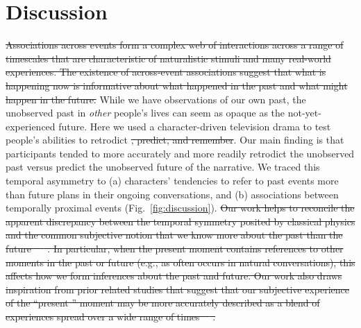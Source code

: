 \documentclass[10pt]{article}
\providecommand{\DIFaddtex}[1]{{\protect\color{blue}\uwave{#1}}} %
\providecommand{\DIFdeltex}[1]{{\protect\color{red}\sout{#1}}}                      %
\providecommand{\DIFaddbegin}{} %
\providecommand{\DIFaddend}{} %
\providecommand{\DIFdelbegin}{} %
\providecommand{\DIFdelend}{} %
\providecommand{\DIFadd}[1]{\texorpdfstring{\DIFaddtex{#1}}{#1}} %
\providecommand{\DIFdel}[1]{\texorpdfstring{\DIFdeltex{#1}}{}} %
\newcommand{\DIFscaledelfig}{0.5}
\newlength{\DIFdelgraphicswidth} %
\newlength{\DIFdelgraphicsheight} %
\newcommand{\DIFaddincludegraphics}[2][]{{\color{blue}\fbox{\DIFOincludegraphics[#1]{#2}}}} %
\newcommand{\DIFdelincludegraphics}[2][]{%
\sbox{\DIFdelgraphicsbox}{\DIFOincludegraphics[#1]{#2}}%
\settoboxwidth{\DIFdelgraphicswidth}{\DIFdelgraphicsbox} %
\settoboxtotalheight{\DIFdelgraphicsheight}{\DIFdelgraphicsbox} %
\scalebox{\DIFscaledelfig}{%
\parbox[b]{\DIFdelgraphicswidth}{\usebox{\DIFdelgraphicsbox}\\[-\baselineskip] \rule{\DIFdelgraphicswidth}{0em}}\llap{\resizebox{\DIFdelgraphicswidth}{\DIFdelgraphicsheight}{%
\setlength{\unitlength}{\DIFdelgraphicswidth}%
\begin{picture}(1,1)%
\thicklines\linethickness{2pt} %
{\color[rgb]{1,0,0}\put(0,0){\framebox(1,1){}}}%
{\color[rgb]{1,0,0}\put(0,0){\line( 1,1){1}}}%
{\color[rgb]{1,0,0}\put(0,1){\line(1,-1){1}}}%
\end{picture}%
}\hspace*{3pt}}} %
} %
\DeclareRobustCommand{\DIFaddbegin}{\DIFOaddbegin \let\includegraphics\DIFaddincludegraphics} %
\DeclareRobustCommand{\DIFaddend}{\DIFOaddend \let\includegraphics\DIFOincludegraphics} %
\DeclareRobustCommand{\DIFdelbegin}{\DIFOdelbegin \let\includegraphics\DIFdelincludegraphics} %
\DeclareRobustCommand{\DIFdelend}{\DIFOaddend \let\includegraphics\DIFOincludegraphics} %
\begin{document}
\section*{Discussion}
\DIFdelbegin \DIFdel{Associations across events form a complex web of interactions across a range of timescales that are characteristic of naturalistic stimuli and many real-world experiences.  The existence of across-event associations suggest that what is happening now is informative about what happened in the past and what might happen in the future.
}\DIFdelend While we have observations of our own past, the unobserved past in \textit{other} people's lives can seem as opaque as the not-yet-experienced future.  Here we used a character-driven television drama to test people's abilities to retrodict \DIFdelbegin \DIFdel{, predict, and remember}\DIFdelend \DIFaddbegin \DIFadd{the past and predict the future}\DIFaddend .  Our main finding is that participants tended to more accurately and more readily retrodict the unobserved past versus predict the unobserved future of the narrative.  We traced this temporal asymmetry to (a) characters' tendencies to refer to past events more than future plans in their ongoing conversations, and (b) associations between temporally proximal events (Fig.~\ref{fig:discussion}).  
\DIFdelbegin \DIFdel{Our work helps to reconcile the apparent discrepancy between the temporal symmetry posited by classical physics and the common subjective notion that we know more about the past than the future ~\mbox{%
\citep{Cove94}}\hskip0pt%
. 
In particular, when the present moment contains references to other moments in the past or future (e.g., as often occurs in natural conversations), this affects how we form inferences about the past and future. Our work also draws inspiration from prior related studies that suggest that our subjective experience of the ``present '' moment may be more accurately described as a blend of experiences spread over a wide range of times~\mbox{%
\citep{Mann21a, MlodBrun14}}\hskip0pt%
.
}\DIFdelend 
\end{document}
